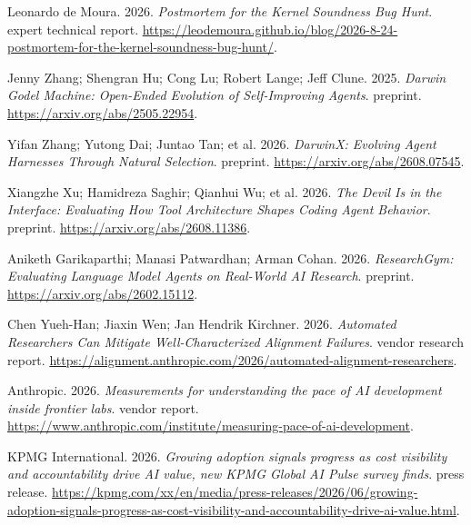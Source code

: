 {\begin{description}[leftmargin=2em,labelwidth=1.5em,itemsep=1pt,parsep=0pt]
\item[92.] \hypertarget{ref-demourakernel2026}{} Leonardo de Moura. 2026. \textit{Postmortem for the Kernel Soundness Bug Hunt}. expert technical report. \url{https://leodemoura.github.io/blog/2026-8-24-postmortem-for-the-kernel-soundness-bug-hunt/}.

\item[93.] \hypertarget{ref-dgm2025}{} Jenny Zhang; Shengran Hu; Cong Lu; Robert Lange; Jeff Clune. 2025. \textit{Darwin Godel Machine: Open-Ended Evolution of Self-Improving Agents}. preprint. \url{https://arxiv.org/abs/2505.22954}.

\item[94.] \hypertarget{ref-darwinx2026}{} Yifan Zhang; Yutong Dai; Juntao Tan; et al. 2026. \textit{DarwinX: Evolving Agent Harnesses Through Natural Selection}. preprint. \url{https://arxiv.org/abs/2608.07545}.

\item[95.] \hypertarget{ref-interfaces2026}{} Xiangzhe Xu; Hamidreza Saghir; Qianhui Wu; et al. 2026. \textit{The Devil Is in the Interface: Evaluating How Tool Architecture Shapes Coding Agent Behavior}. preprint. \url{https://arxiv.org/abs/2608.11386}.

\item[96.] \hypertarget{ref-researchgym2026}{} Aniketh Garikaparthi; Manasi Patwardhan; Arman Cohan. 2026. \textit{ResearchGym: Evaluating Language Model Agents on Real-World AI Research}. preprint. \url{https://arxiv.org/abs/2602.15112}.

\item[97.] \hypertarget{ref-alignment2026}{} Chen Yueh-Han; Jiaxin Wen; Jan Hendrik Kirchner. 2026. \textit{Automated Researchers Can Mitigate Well-Characterized Alignment Failures}. vendor research report. \url{https://alignment.anthropic.com/2026/automated-alignment-researchers}.

\item[98.] \hypertarget{ref-rdmetrics2026}{} Anthropic. 2026. \textit{Measurements for understanding the pace of AI development inside frontier labs}. vendor report. \url{https://www.anthropic.com/institute/measuring-pace-of-ai-development}.

\item[99.] \hypertarget{ref-ref-fee88585ea}{} KPMG International. 2026. \textit{Growing adoption signals progress as cost visibility and accountability drive AI value, new KPMG Global AI Pulse survey finds}. press release. \url{https://kpmg.com/xx/en/media/press-releases/2026/06/growing-adoption-signals-progress-as-cost-visibility-and-accountability-drive-ai-value.html}.


\end{description}}
